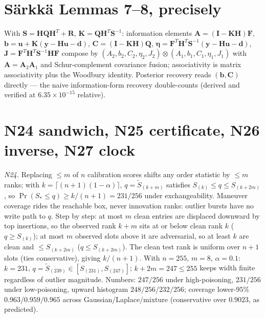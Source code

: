 \documentclass[11pt,oneside]{book}
\begin{document}
\section{S\"arkk\"a Lemmas 7--8, precisely}
\label{sec:sarkka-lemmas}

With $\mathbf{S}=\mathbf{HQH}^T+\mathbf{R}$,
$\mathbf{K}=\mathbf{QH}^T\mathbf{S}^{-1}$: information elements
$\mathbf{A}=(\mathbf{I}-\mathbf{KH})\mathbf{F}$,
$\mathbf{b}=\mathbf{u}+\mathbf{K}(\mathbf{y}-\mathbf{Hu}-\mathbf{d})$,
$\mathbf{C}=(\mathbf{I}-\mathbf{KH})\mathbf{Q}$,
$\boldsymbol{\eta}=\mathbf{F}^T\mathbf{H}^T\mathbf{S}^{-1}(\mathbf{y}-\mathbf{Hu}-\mathbf{d})$,
$\mathbf{J}=\mathbf{F}^T\mathbf{H}^T\mathbf{S}^{-1}\mathbf{HF}$ compose by
$(A_2,b_2,C_2,\eta_2,J_2)\otimes(A_1,b_1,C_1,\eta_1,J_1)$ with
$\mathbf{A}=\mathbf{A}_2\mathbf{A}_1$ and Schur-complement covariance
fusion; associativity is matrix associativity plus the Woodbury identity.
Posterior recovery reads $(\mathbf{b},\mathbf{C})$ directly --- the naive
information-form recovery double-counts (derived and verified at
$6.35\times10^{-15}$ relative).

\section{N24 sandwich, N25 certificate, N26 inverse, N27 clock}
\label{sec:frontier-proofs}

\emph{N24.} Replacing $\le m$ of $n$ calibration scores shifts any order
statistic by $\le m$ ranks; with $k=\lceil(n+1)(1-\alpha)\rceil$,
$q=\tilde S_{(k+m)}$ satisfies $S_{(k)}\le q\le S_{(k+2m)}$, so
$\Pr(S_*\le q)\ge k/(n+1)=231/256$ under exchangeability. Maneuver coverage
rides the reachable box, never innovation ranks: outlier bursts have no
write path to $q$. Step by step: at most $m$ clean entries are displaced
downward by top insertions, so the observed rank $k+m$ sits at or below
clean rank $k$ ($q\ge S_{(k)}$); at most $m$ observed slots above it are
adversarial, so at least $k$ are clean and $\le S_{(k+2m)}$ ($q\le
S_{(k+2m)}$). The clean test rank is uniform over $n+1$ slots (ties
conservative), giving $k/(n+1)$. With $n=255$, $m=8$, $\alpha=0.1$:
$k=231$, $q=\tilde S_{(239)}\in[S_{(231)},S_{(247)}]$; $k+2m=247\le255$ keeps
width finite regardless of outlier magnitude. Numbers: $247/256$ under
high-poisoning, $231/256$ under low-poisoning, upward histogram
$248/256$/$232/256$; coverage lower-$95\%$ $0.963/0.959/0.965$ across
Gaussian/Laplace/mixture (conservative over $0.9023$, as predicted).
\end{document}
